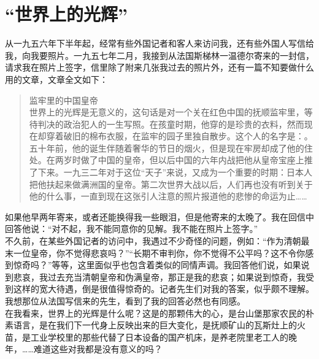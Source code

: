 \fancyhead[RO]{} %
\fancyhead[LE]{} %
\chapter*{“世界上的光辉”}
\thispagestyle{empty}
从一九五六年下半年起，经常有些外国记者和客人来访问我，还有些外国人写信给我，向我要照片。一九五七年二月，我接到从法国斯梯林一温德尔寄来的一封信，请求我在照片上签字，信里除了附来几张我过去的照片外，还有一篇不知要做什么用的文章，文章全文如下：\\

\begin{quote}
	监牢里的中国皇帝\\

世界上的光辉是无意义的，这句话是对一个关在红色中国的抚顺监牢里，等待判决的政治犯人的一生写照。在孩童时期，他穿的是珍贵的衣料，然而现在却穿着破旧的棉布衣服，在监牢的园子里独自散步。这个人的名字是：。五十年前，他的诞生伴随着奢华的节日的烟火，但是现在牢房却成了他的住处。在两岁时做了中国的皇帝，但以后中国的六年内战把他从皇帝宝座上推了下来。一九三二年对于这位“天子”来说，又成为一个重要的时期：日本人把他扶起来做满洲国的皇帝。第二次世界大战以后，人们再也没有听到关于他的什么事，一直到现在这张引人注意的照片报道他的悲惨的命运为止……\\
\end{quote}

如果他早两年寄来，或者还能换得我一些眼泪，但是他寄来的太晚了。我在回信中回答他说：“对不起，我不能同意你的见解。我不能在照片上签字。”\\

不久前，在某些外国记者的访问中，我遇过不少奇怪的问题，例如：“作为清朝最末一位皇帝，你不觉得悲哀吗？”“长期不审判你，你不觉得不公平吗？这不令你感到惊奇吗？”等等，这里面似乎也包含着类似的同情声调。我回答他们说，如果说到悲哀，我过去充当清朝皇帝和伪满皇帝，那正是我的悲哀；如果说到惊奇，我受到这样的宽大待遇，倒是很值得惊奇的。记者先生们对我的答案，似乎颇不理解。我想那位从法国写信来的先生，看到了我的回答必然也有同感。\\

在我看来，世界上的光辉是什么呢？这是的那颗伟大的心，是台山堡那家农民的朴素语言，是在我们下一代身上反映出来的巨大变化，是抚顺矿山的瓦斯灶上的火苗，是工业学校里的那些代替了日本设备的国产机床，是养老院里老工人的晚年，……难道这些对我都是没有意义的吗？\\

